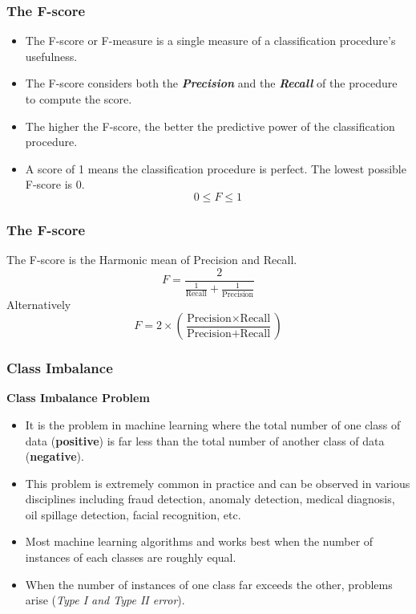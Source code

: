 \documentclass[a4]{beamer}
\begin{document}
\begin{frame}
	\frametitle{The F-score}
	\Large
	\begin{itemize}
		\item The F-score or F-measure is a single measure of a classification procedure's usefulness. 
		\item The F-score considers both the \textit{\textbf{Precision}} and the \textit{\textbf{Recall}} of the procedure to compute the score.
		\item The higher the F-score, the better the predictive power of the 
		classification procedure. 
		\item A score of 1 means the classification procedure is perfect. The lowest possible F-score is 0.
		\[ 0 \leq F \leq 1 \]
	\end{itemize}
\end{frame}

\begin{frame}
	\frametitle{The F-score}
	\Large The F-score is the Harmonic mean of Precision and Recall.
	\[ F = \frac{2}{\frac{1}{\mbox{Recall}} + \frac{1}{\mbox{Precision}}} \]
	Alternatively
	\[ F = 2 \times \left( \frac{\mbox{Precision} \times \mbox{Recall}}{\mbox{Precision} + \mbox{Recall}} \right) \] 
\end{frame}
\begin{frame}
	\frametitle{Class Imbalance}
	\large
	\noindent \textbf{Class Imbalance Problem}
	\begin{itemize}
		\item It is the problem in machine learning where the total number of one class of data (\textbf{positive}) is far less than the total number of another class of data (\textbf{negative}). 
		\item This problem is extremely common in practice and can be observed in various disciplines including fraud detection, anomaly detection, medical diagnosis, oil spillage detection, facial recognition, etc.
		\item Most machine learning algorithms and works best when the number of instances of each classes are roughly equal. 
		\item When the number of instances of one class far exceeds the other, problems arise (\textit{Type I  and Type II error}).
	\end{itemize}
	
\end{frame}
\end{document}
